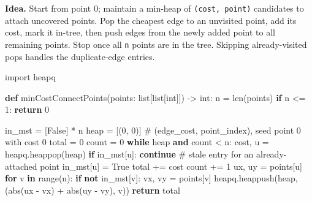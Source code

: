 \documentclass[11pt]{article}
\newenvironment{Shaded}{\begin{snugshade}}{\end{snugshade}}
\newcommand{\BuiltInTok}[1]{\textcolor[rgb]{0.50,0.55,0.55}{#1}}
\newcommand{\CommentTok}[1]{\textcolor[rgb]{0.48,0.49,0.49}{#1}}
\newcommand{\ControlFlowTok}[1]{\textcolor[rgb]{0.99,0.74,0.29}{\textbf{#1}}}
\newcommand{\DecValTok}[1]{\textcolor[rgb]{0.96,0.45,0.00}{#1}}
\newcommand{\ImportTok}[1]{\textcolor[rgb]{0.15,0.68,0.38}{#1}}
\newcommand{\KeywordTok}[1]{\textcolor[rgb]{0.81,0.81,0.76}{\textbf{#1}}}
\newcommand{\NormalTok}[1]{\textcolor[rgb]{0.81,0.81,0.76}{#1}}
\newcommand{\OperatorTok}[1]{\textcolor[rgb]{0.81,0.81,0.76}{#1}}
\newcommand{\VariableTok}[1]{\textcolor[rgb]{0.15,0.68,0.68}{#1}}
\begin{document}
\textbf{Idea.} Start from point 0; maintain a min-heap of \texttt{(cost,\ point)} candidates to attach uncovered points. Pop the cheapest edge to an unvisited point, add its cost, mark it in-tree, then push edges from the newly added point to all remaining points. Stop once all \texttt{n} points are in the tree. Skipping already-visited pops handles the duplicate-edge entries.


\begin{Shaded}
\begin{Highlighting}[]
\ImportTok{import}\NormalTok{ heapq}

\KeywordTok{def}\NormalTok{ minCostConnectPoints(points: }\BuiltInTok{list}\NormalTok{[}\BuiltInTok{list}\NormalTok{[}\BuiltInTok{int}\NormalTok{]]) }\OperatorTok{{-}\textgreater{}} \BuiltInTok{int}\NormalTok{:}
\NormalTok{    n }\OperatorTok{=} \BuiltInTok{len}\NormalTok{(points)}
    \ControlFlowTok{if}\NormalTok{ n }\OperatorTok{\textless{}=} \DecValTok{1}\NormalTok{:}
        \ControlFlowTok{return} \DecValTok{0}

\NormalTok{    in\_mst }\OperatorTok{=}\NormalTok{ [}\VariableTok{False}\NormalTok{] }\OperatorTok{*}\NormalTok{ n}
\NormalTok{    heap }\OperatorTok{=}\NormalTok{ [(}\DecValTok{0}\NormalTok{, }\DecValTok{0}\NormalTok{)]      }\CommentTok{\# (edge\_cost, point\_index), seed point 0 with cost 0}
\NormalTok{    total }\OperatorTok{=} \DecValTok{0}
\NormalTok{    count }\OperatorTok{=} \DecValTok{0}
    \ControlFlowTok{while}\NormalTok{ heap }\KeywordTok{and}\NormalTok{ count }\OperatorTok{\textless{}}\NormalTok{ n:}
\NormalTok{        cost, u }\OperatorTok{=}\NormalTok{ heapq.heappop(heap)}
        \ControlFlowTok{if}\NormalTok{ in\_mst[u]:}
            \ControlFlowTok{continue}     \CommentTok{\# stale entry for an already{-}attached point}
\NormalTok{        in\_mst[u] }\OperatorTok{=} \VariableTok{True}
\NormalTok{        total }\OperatorTok{+=}\NormalTok{ cost}
\NormalTok{        count }\OperatorTok{+=} \DecValTok{1}
\NormalTok{        ux, uy }\OperatorTok{=}\NormalTok{ points[u]}
        \ControlFlowTok{for}\NormalTok{ v }\KeywordTok{in} \BuiltInTok{range}\NormalTok{(n):}
            \ControlFlowTok{if} \KeywordTok{not}\NormalTok{ in\_mst[v]:}
\NormalTok{                vx, vy }\OperatorTok{=}\NormalTok{ points[v]}
\NormalTok{                heapq.heappush(heap, (}\BuiltInTok{abs}\NormalTok{(ux }\OperatorTok{{-}}\NormalTok{ vx) }\OperatorTok{+} \BuiltInTok{abs}\NormalTok{(uy }\OperatorTok{{-}}\NormalTok{ vy), v))}
    \ControlFlowTok{return}\NormalTok{ total}
\end{Highlighting}
\end{Shaded}
\end{document}

